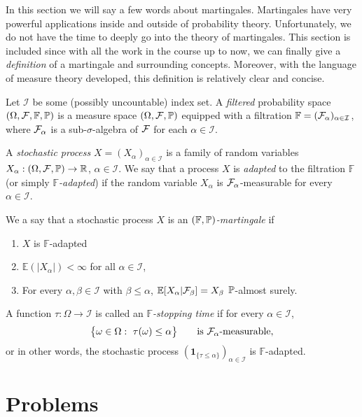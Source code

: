 In this section we will say a few words about martingales. Martingales have very powerful applications inside and outside of probability theory. Unfortunately, we do not have the time to deeply go into the theory of martingales. This section is included since with all the work in the course up to now, we can finally give a \emph{definition} of a martingale and surrounding concepts. Moreover, with the language of measure theory developed, this definition is relatively clear and concise.

Let $\mathcal{I}$ be some (possibly uncountable) index set. A \emph{filtered} probability space $(\Omega, \mathcal F, \mathbb{F}, \mathbb P)$ is a measure space $(\Omega, \mathcal F, \mathbb P)$ equipped with a filtration $\mathbb{F}=(\mathcal F_\alpha)_{\alpha\in\mathcal{I}}$, where $\mathcal F_\alpha$ is a sub-$\sigma$-algebra of $\mathcal F$ for each $\alpha\in\mathcal{I}$.

A \emph{stochastic process} $X=(X_\alpha)_{\alpha\in\mathcal{I}}$ is a family of random variables $X_\alpha : (\Omega, \mathcal F, \mathbb P) \to \mathbb{R}$, $\alpha\in\mathcal{I}$. We say that a process $X$ is \emph{adapted} to the filtration $\mathbb{F}$ (or simply \emph{$\mathbb{F}$-adapted}) if the random variable $X_\alpha$ is $\mathcal F_\alpha$-measurable for every $\alpha \in \mathcal{I}$. 

We a say that a stochastic process $X$ is an \emph{$(\mathbb{F},\mathbb P)$-martingale} if
\begin{enumerate}
\item $X$ is $\mathbb{F}$-adapted
\item $\mathbb{E}(|X_\alpha|) < \infty$ for all $\alpha \in \mathcal{I}$,
\item For every $\alpha,\beta\in\mathcal{I}$ with $\beta\le \alpha$, $\mathbb{E}[X_\alpha | \mathcal F_{\beta}] = X_{\beta}$ $\mathbb P$-almost surely.
\end{enumerate}

A function $\tau:\Omega \to \mathcal{I}$ is called an \emph{$\mathbb{F}$-stopping time} if for every $\alpha \in \mathcal{I}$, 
\[
	\bigl\{ \omega\in\Omega : \ \tau(\omega) \leq \alpha \bigr\}\qquad\text{is $\mathcal F_\alpha$-measurable},
\]
or in other words, the stochastic process $(\mathbf{1}_{\{\tau\le \alpha\}})_{\alpha\in\mathcal{I}}$ is $\mathbb{F}$-adapted.


\section{Problems}

